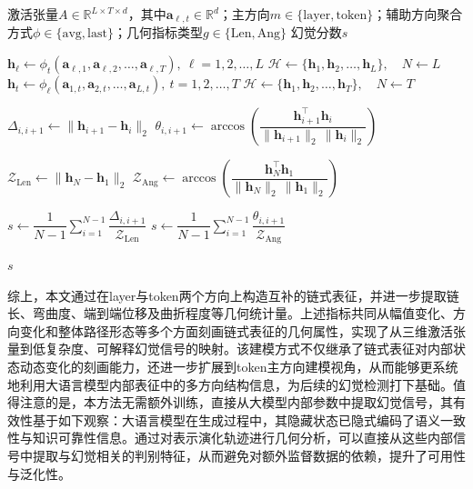 \begin{algorithm}[htb]
\caption{ATScore算法}
\label{alg:atscore}
\begin{algorithmic}[1]
\Require 激活张量$A\in\mathbb{R}^{L\times T\times d}$，其中$\mathbf{a}_{\ell,t}\in\mathbb{R}^d$；主方向$m\in\{\mathrm{layer},\mathrm{token}\}$；辅助方向聚合方式$\phi\in\{\mathrm{avg},\mathrm{last}\}$；几何指标类型$g\in\{\mathrm{Len},\mathrm{Ang}\}$
\Ensure 幻觉分数$s$

    \State $\mathbf{h}_{\ell}\gets \phi_t(\mathbf{a}_{\ell,1},\mathbf{a}_{\ell,2},\dots,\mathbf{a}_{\ell,T}),\ \ell=1,2,\dots,L$
    \State $\mathcal{H}\gets\{\mathbf{h}_1,\mathbf{h}_2,\dots,\mathbf{h}_L\},\quad N\gets L$
\Else
    \State $\mathbf{h}_{t}\gets \phi_{\ell}(\mathbf{a}_{1,t},\mathbf{a}_{2,t},\dots,\mathbf{a}_{L,t}),\ t=1,2,\dots,T$
    \State $\mathcal{H}\gets\{\mathbf{h}_1,\mathbf{h}_2,\dots,\mathbf{h}_T\},\quad N\gets T$
\EndIf

    \State $\Delta_{i,i+1}\gets \|\mathbf{h}_{i+1}-\mathbf{h}_i\|_2$
    \State $\theta_{i,i+1}\gets \arccos\!\left(\dfrac{\mathbf{h}_{i+1}^{\top}\mathbf{h}_i}{\|\mathbf{h}_{i+1}\|_2\,\|\mathbf{h}_i\|_2}\right)$
\EndFor

\State $\mathcal{Z}_{\mathrm{Len}}\gets \|\mathbf{h}_N-\mathbf{h}_1\|_2$
\State $\mathcal{Z}_{\mathrm{Ang}}\gets \arccos\!\left(\dfrac{\mathbf{h}_N^{\top}\mathbf{h}_1}{\|\mathbf{h}_N\|_2\,\|\mathbf{h}_1\|_2}\right)$

    \State $s\gets \dfrac{1}{N-1}\sum_{i=1}^{N-1}\dfrac{\Delta_{i,i+1}}{\mathcal{Z}_{\mathrm{Len}}}$
\Else
    \State $s\gets \dfrac{1}{N-1}\sum_{i=1}^{N-1}\dfrac{\theta_{i,i+1}}{\mathcal{Z}_{\mathrm{Ang}}}$
\EndIf

\State \Return $s$
\end{algorithmic}
\end{algorithm}

综上，本文通过在layer与token两个方向上构造互补的链式表征，并进一步提取链长、弯曲度、端到端位移及曲折程度等几何统计量。上述指标共同从幅值变化、方向变化和整体路径形态等多个方面刻画链式表征的几何属性，实现了从三维激活张量到低复杂度、可解释幻觉信号的映射。该建模方式不仅继承了链式表征对内部状态动态变化的刻画能力，还进一步扩展到token主方向建模视角，从而能够更系统地利用大语言模型内部表征中的多方向结构信息，为后续的幻觉检测打下基础。值得注意的是，本方法无需额外训练，直接从大模型内部参数中提取幻觉信号，其有效性基于如下观察：大语言模型在生成过程中，其隐藏状态已隐式编码了语义一致性与知识可靠性信息。通过对表示演化轨迹进行几何分析，可以直接从这些内部信号中提取与幻觉相关的判别特征，从而避免对额外监督数据的依赖，提升了可用性与泛化性。

